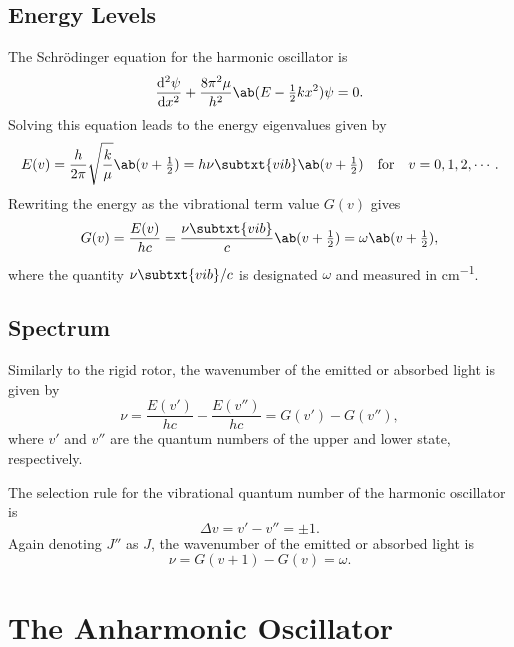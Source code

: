 \subsection{Energy Levels}

The Schr\"odinger equation for the harmonic oscillator is
\begin{equation*}
    \odv[2]{\psi}{x} + \frac{8\pi^{2}\mu}{h^{2}}\ab(E - \tfrac{1}{2}kx^{2})\psi = 0.
\end{equation*}
Solving this equation leads to the energy eigenvalues given by
\begin{equation*}
    E(v) = \frac{h}{2\pi}\sqrt{\frac{k}{\mu}}\ab(v + \tfrac{1}{2}) = h\nu\subtxt{vib}\ab(v + \tfrac{1}{2}) \quad\text{for}\quad v = 0, 1, 2, \dotsb.
\end{equation*}
Rewriting the energy as the vibrational term value $G(v)$ gives
\begin{equation*}
    G(v) = \frac{E(v)}{hc} = \frac{\nu\subtxt{vib}}{c}\ab(v + \tfrac{1}{2}) = \omega\ab(v + \tfrac{1}{2}),
\end{equation*}
where the quantity $\nu\subtxt{vib}/c$ is designated $\omega$ and measured in \unit{cm^{-1}}.

\subsection{Spectrum}

Similarly to the rigid rotor, the wavenumber of the emitted or absorbed light is given by
\begin{equation*}
    \nu = \frac{E(v')}{hc} - \frac{E(v'')}{hc} = G(v') - G(v''),
\end{equation*}
where $v'$ and $v''$ are the quantum numbers of the upper and lower state, respectively.

The selection rule for the vibrational quantum number of the harmonic oscillator is
\begin{equation*}
    \Delta{}v = v' - v'' = \pm 1.
\end{equation*}
Again denoting $J''$ as $J$, the wavenumber of the emitted or absorbed light is
\begin{equation*}
    \nu = G(v + 1) - G(v) = \omega.
\end{equation*}

\section{The Anharmonic Oscillator}
\label{s:the_anharmonic_oscillator}

